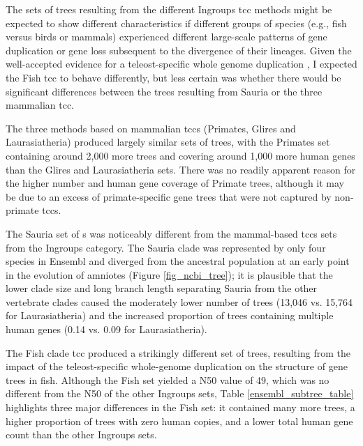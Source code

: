 The sets of trees resulting from the different Ingroups \ac{tcc}
methods might be expected to show different characteristics if
different groups of species (e.g., fish versus birds or mammals)
experienced different large-scale patterns of gene duplication or gene
loss subsequent to the divergence of their lineages. Given the
well-accepted evidence for a teleost-specific whole genome duplication
\citep{Jaillon2004}, I expected the Fish \ac{tcc} to behave
differently, but less certain was whether there would be significant differences
between the trees resulting from Sauria or the three mammalian \ac{tcc}.

The three methods based on mammalian \acp{tcc} (Primates, Glires and
Laurasiatheria) produced largely similar sets of trees, with the
Primates set containing around 2,000 more trees and covering around
1,000 more human genes than the Glires and Laurasiatheria sets. There
was no readily apparent reason for the higher number and human gene
coverage of Primate trees, although it may be due to an excess of
primate-specific gene trees that were not captured by non-primate
\acp{tcc}.

The Sauria set of \subtr{}s was noticeably different from the
mammal-based \acp{tcc} sets from the Ingroups category. The Sauria
clade was represented by only four species in Ensembl and diverged
from the \mammln ancestral population at an early point in the
evolution of amniotes (Figure \ref{fig_ncbi_tree}); it is plausible
that the lower clade size and long branch length separating Sauria
from the other vertebrate clades caused the moderately lower number of
trees (13,046 vs. 15,764 for Laurasiatheria) and the increased
proportion of trees containing multiple human genes (0.14 vs. 0.09 for
Laurasiatheria).

The Fish clade \ac{tcc} produced a strikingly different set of trees,
resulting from the impact of the teleost-specific whole-genome
duplication on the structure of gene trees in fish. Although the Fish
\subtr set yielded a N50 value of 49, which was no different from the
N50 of the other Ingroups sets, Table \ref{ensembl_subtree_table}
highlights three major differences in the Fish set: it contained many
more trees, a higher proportion of trees with zero human copies, and a
lower total human gene count than the other Ingroups sets.

